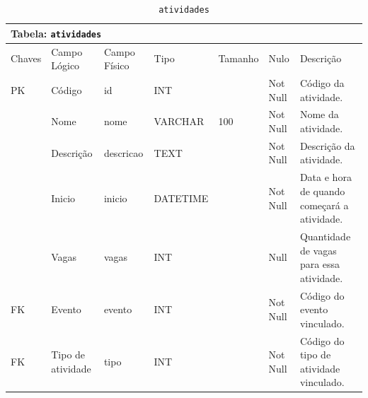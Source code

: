 \documentclass[12pt,a4paper]{article}
\begin{document}
\begin{center}
\begin{table}[h!]
	\caption{\texttt{atividades}}
	\label{tabela:atividades}
	\begin{tabular}{|p{1cm}|p{1.5cm}|p{1.25cm}|p{1.25cm}|p{1.75cm}|p{1.25cm}|p{4.5cm}|}\hline	
		\multicolumn{7}{|p{16cm}|}{\cellcolor{cinzaClaro}  \centering Tabela: \texttt{atividades}} \\ \hline %
		{\small Chaves} & {\small Campo Lógico} & {\small Campo Físico} & {\small Tipo} & {\small Tamanho} & {\small Nulo} & {\small Descrição}\\\hline %
		
		{\tiny PK} & {\tiny Código} & {\tiny id} & {\tiny INT} & {\tiny } & {\tiny Not Null} &{\tiny Código da atividade.}\\\hline
		{\tiny } & {\tiny Nome} & {\tiny nome} & {\tiny VARCHAR} & {\tiny 100} & {\tiny Not Null} &{\tiny Nome da atividade.}\\\hline
		{\tiny } & {\tiny Descrição} & {\tiny descricao} & {\tiny TEXT} & {\tiny } & {\tiny Not Null} &{\tiny Descrição da atividade.}\\\hline
		{\tiny } & {\tiny Inicio} & {\tiny inicio} & {\tiny DATETIME} & {\tiny } & {\tiny Not Null} &{\tiny Data e hora de quando começará a atividade.}\\\hline
		{\tiny } & {\tiny Vagas} & {\tiny vagas} & {\tiny INT} & {\tiny } & {\tiny Null} &{\tiny Quantidade de vagas para essa atividade.}\\\hline
		{\tiny FK} & {\tiny Evento} & {\tiny evento} & {\tiny INT} & {\tiny } & {\tiny Not Null} &{\tiny Código do evento vinculado.}\\\hline
		{\tiny FK} & {\tiny Tipo de atividade} & {\tiny tipo} & {\tiny INT} & {\tiny } & {\tiny Not Null} &{\tiny Código do tipo de atividade vinculado.}\\\hline
		
			
	\end{tabular}
\end{table}	
\end{center}
\end{document}
